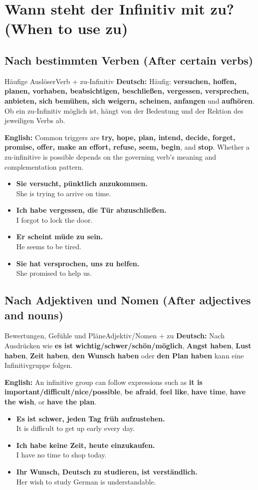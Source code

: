 \documentclass[a4paper,11pt]{article}
\newcommand{\GermanText}[1]{\textbf{Deutsch: }#1\par}
\newcommand{\EnglishText}[1]{{\small\color{SoftGray}\textbf{English: }#1\par}}
\newcommand{\ExampleItem}[2]{\item \textbf{#1}\\{\small\color{SoftGray}#2}}
\begin{document}
\section{Wann steht der Infinitiv mit zu? \textnormal{(When to use zu)}}
\subsection{Nach bestimmten Verben \textnormal{(After certain verbs)}}
\begin{grammarentry}{Häufige Auslöser}{Verb + zu-Infinitiv}
\GermanText{Häufig: \textbf{versuchen, hoffen, planen, vorhaben, beabsichtigen, beschließen, vergessen, versprechen, anbieten, sich bemühen, sich weigern, scheinen, anfangen} und \textbf{aufhören}. Ob ein zu-Infinitiv möglich ist, hängt von der Bedeutung und der Rektion des jeweiligen Verbs ab.}
\EnglishText{Common triggers are \textbf{try, hope, plan, intend, decide, forget, promise, offer, make an effort, refuse, seem, begin}, and \textbf{stop}. Whether a zu-infinitive is possible depends on the governing verb's meaning and complementation pattern.}
\end{grammarentry}
\begin{exbox}\begin{itemize}
\ExampleItem{Sie versucht, pünktlich anzukommen.}{She is trying to arrive on time.}
\ExampleItem{Ich habe vergessen, die Tür abzuschließen.}{I forgot to lock the door.}
\ExampleItem{Er scheint müde zu sein.}{He seems to be tired.}
\ExampleItem{Sie hat versprochen, uns zu helfen.}{She promised to help us.}
\end{itemize}\end{exbox}

\subsection{Nach Adjektiven und Nomen \textnormal{(After adjectives and nouns)}}
\begin{grammarentry}{Bewertungen, Gefühle und Pläne}{Adjektiv/Nomen + zu}
\GermanText{Nach Ausdrücken wie \textbf{es ist wichtig/schwer/schön/möglich}, \textbf{Angst haben}, \textbf{Lust haben}, \textbf{Zeit haben}, \textbf{den Wunsch haben} oder \textbf{den Plan haben} kann eine Infinitivgruppe folgen.}
\EnglishText{An infinitive group can follow expressions such as \textbf{it is important/difficult/nice/possible}, \textbf{be afraid}, \textbf{feel like}, \textbf{have time}, \textbf{have the wish}, or \textbf{have the plan}.}
\end{grammarentry}
\begin{exbox}\begin{itemize}
\ExampleItem{Es ist schwer, jeden Tag früh aufzustehen.}{It is difficult to get up early every day.}
\ExampleItem{Ich habe keine Zeit, heute einzukaufen.}{I have no time to shop today.}
\ExampleItem{Ihr Wunsch, Deutsch zu studieren, ist verständlich.}{Her wish to study German is understandable.}
\end{itemize}\end{exbox}
\end{document}
